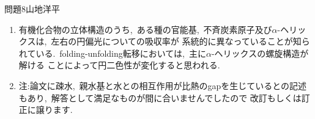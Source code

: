 \documentclass[fleqn]{jbook}
\begin{document}
\begin{answer}{問題8}{山地洋平}
\begin{enumerate}
\begin{eqnarray}
&& -T\left( \Delta S (T_{m}) + \Delta C_{p}\ln \frac{T}{T_{m}} \right),\nonumber
\end{eqnarray}
と計算される.\ ただし,\ $T_{0}$として転移温度$T_{m}$をとった.\par
$\Delta G (T)$は,\ $\displaystyle T=T_{m}\exp \left( - \frac{\Delta S(T_{m})}{\Delta C_{p}}\right)$
でピークを持つ上に凸な関数である.\  $\displaystyle \frac{\Delta S(T_{m})}{\Delta C_{p}}$が小さいならば,\ $\Delta G (T)$は$T=T_{m}$以外に
低温側にもう一つ零点をもつことが可能である.
\item
有機化合物の立体構造のうち,\ ある種の官能基,\ 不斉炭素原子及び$\alpha$-ヘリックスは,\ 左右の円偏光についての吸収率が
系統的に異なっていることが知られている.\ folding-unfolding転移においては,\ 主に$\alpha$-ヘリックスの螺旋構造が解ける
ことによって円二色性が変化すると思われる.
\item
注:論文に疎水,\ 親水基と水との相互作用が比熱のgapを生じているとの記述もあり,\ 解答として満足なものが間に合いませんでしたので
改訂もしくは訂正に譲ります.
\end{enumerate}
\end{answer}
\end{document}
